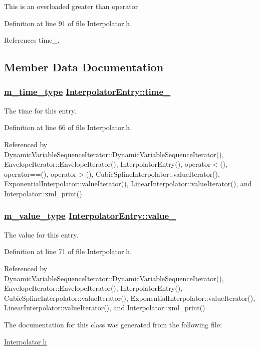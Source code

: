 This is an overloaded greater than operator 

Definition at line 91 of file Interpolator.h.

References time\_\-.

\subsection{Member Data Documentation}
\hypertarget{classInterpolatorEntry_o0}{
\subsubsection[time\_\-]{\setlength{\rightskip}{0pt plus 5cm}\hyperlink{Types_8h_a2}{m\_\-time\_\-type} \hyperlink{classInterpolatorEntry_o0}{Interpolator\-Entry::time\_\-}}}
\label{classInterpolatorEntry_o0}


The time for this entry. 

Definition at line 66 of file Interpolator.h.

Referenced by Dynamic\-Variable\-Sequence\-Iterator::Dynamic\-Variable\-Sequence\-Iterator(), Envelope\-Iterator::Envelope\-Iterator(), Interpolator\-Entry(), operator$<$(), operator==(), operator$>$(), Cubic\-Spline\-Interpolator::value\-Iterator(), Exponential\-Interpolator::value\-Iterator(), Linear\-Interpolator::value\-Iterator(), and Interpolator::xml\_\-print().\hypertarget{classInterpolatorEntry_o1}{
\subsubsection[value\_\-]{\setlength{\rightskip}{0pt plus 5cm}\hyperlink{Types_8h_a3}{m\_\-value\_\-type} \hyperlink{classInterpolatorEntry_o1}{Interpolator\-Entry::value\_\-}}}
\label{classInterpolatorEntry_o1}


The value for this entry. 

Definition at line 71 of file Interpolator.h.

Referenced by Dynamic\-Variable\-Sequence\-Iterator::Dynamic\-Variable\-Sequence\-Iterator(), Envelope\-Iterator::Envelope\-Iterator(), Interpolator\-Entry(), Cubic\-Spline\-Interpolator::value\-Iterator(), Exponential\-Interpolator::value\-Iterator(), Linear\-Interpolator::value\-Iterator(), and Interpolator::xml\_\-print().

The documentation for this class was generated from the following file:\begin{CompactItemize}
\item 
\hyperlink{Interpolator_8h}{Interpolator.h}\end{CompactItemize}
